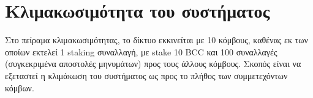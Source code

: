 \documentclass{article}
\newcommand{\eng}[1]{\foreignlanguage{english}{#1}} %
\begin{document}
% 
%             
%             
%             

\clearpage
\section{Κλιμακωσιμότητα του συστήματος}

Στο πείραμα κλιμακωσιμότητας, το δίκτυο εκκινείται με 10 κόμβους, καθένας εκ
των οποίων εκτελεί 1 \eng{staking} συναλλαγή, με \eng{stake 10 BCC} και 100
συναλλαγές (συγκεκριμένα αποστολές μηνυμάτων) προς τους άλλους κόμβους. Σκοπός
είναι να εξεταστεί η κλιμάκωση του συστήματος ως προς το πλήθος των
συμμετεχόντων κόμβων.
\end{document}
